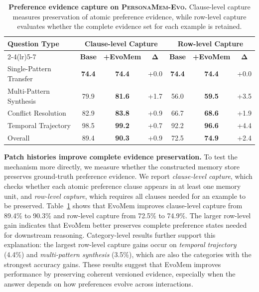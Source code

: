 \documentclass{llmxive}
\begin{document}
\begin{table}[t]
  \centering
  \setlength{\tabcolsep}{5pt}
  \begin{tabular}{lcccccc}
  \toprule
  \multirow{2}{*}{\textbf{Question Type}}
  & \multicolumn{3}{c}{\textbf{Clause-level Capture}}
  & \multicolumn{3}{c}{\textbf{Row-level Capture}} \\
  \cmidrule(lr){2-4}\cmidrule(lr){5-7}
  & \textbf{Base} & \textbf{+EvoMem} & $\boldsymbol{\Delta}$
  & \textbf{Base} & \textbf{+EvoMem} & $\boldsymbol{\Delta}$ \\
  \midrule
  Single-Pattern Transfer & \textbf{74.4} & \textbf{74.4} & +0.0 & \textbf{74.4} & \textbf{74.4} & +0.0 \\
  Multi-Pattern Synthesis & 79.9 & \textbf{81.6} & +1.7 & 56.0 & \textbf{59.5} & +3.5 \\
  Conflict Resolution & 82.9 & \textbf{83.8} & +0.9 & 66.7 & \textbf{68.6} & +1.9 \\
  Temporal Trajectory & 98.5 & \textbf{99.2} & +0.7 & 92.2 & \textbf{96.6} & +4.4 \\
  \midrule
\rowcolor{blue!8}
  Overall & 89.4 & \textbf{90.3} & +0.9 & 72.5 & \textbf{74.9} & +2.4 \\
  \bottomrule
  \end{tabular}
  \vspace{-2mm}
  \label{tab:persona_capture_by_ood}
\caption{
\textbf{\small Preference evidence capture on \textsc{PersonaMem-Evo}.}
Clause-level capture measures preservation of atomic preference evidence, while row-level capture evaluates whether the complete evidence set for each example is retained.
}
\end{table}



\textbf{Patch histories improve complete evidence preservation.} \quad
To test the mechanism more directly, we measure whether the constructed memory store preserves ground-truth preference evidence. We report \emph{clause-level capture}, which checks whether each atomic preference clause appears in at least one memory unit, and \emph{row-level capture}, which requires all clauses needed for an example to be preserved. Table~\ref{tab:persona_capture_by_ood} shows that EvoMem improves clause-level capture from 89.4\% to 90.3\% and row-level capture from 72.5\% to 74.9\%. The larger row-level gain indicates that EvoMem better preserves complete preference states needed for downstream reasoning. Category-level results further support this explanation: the largest row-level capture gains occur on \emph{temporal trajectory} (4.4\%) and \emph{multi-pattern synthesis} (3.5\%), which are also the categories with the strongest accuracy gains. These results suggest that EvoMem improves performance by preserving coherent versioned evidence, especially when the answer depends on how preferences evolve across interactions.
\end{document}
